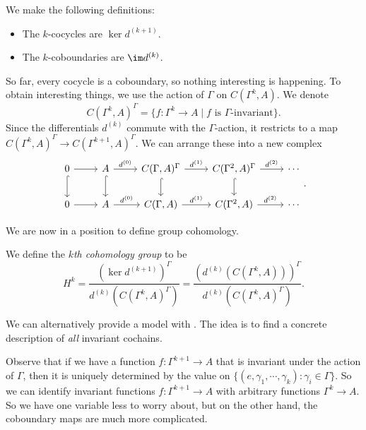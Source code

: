 \documentclass[a4paper]{article}
\begin{document}
We make the following definitions:
\begin{defi}\leavevmode
  \begin{itemize}
    \item The $k$-cocycles are $\ker d^{(k + 1)}$.
    \item The $k$-coboundaries are $\im d^{(k)}$.
  \end{itemize}
\end{defi}
So far, every cocycle is a coboundary, so nothing interesting is happening. To obtain interesting things, we use the action of $\Gamma$ on $C(\Gamma^k, A)$. We denote
\[
  C(\Gamma^k, A)^\Gamma = \{f: \Gamma^k \to A \mid f \text{ is $\Gamma$-invariant}\}.
\]
Since the differentials $d^{(k)}$ commute with the $\Gamma$-action, it restricts to a map $C(\Gamma^k, A)^\Gamma \to C(\Gamma^{k + 1}, A)^\Gamma$. We can arrange these into a new complex
\[
  \begin{tikzcd}
    0 \ar[r] \ar[d, hook] & A \ar[r, "d^{(0)}"] \ar[d, hook] & C(\Gamma, A)^\Gamma \ar[r, "d^{(1)}"] \ar[d, hook] & C(\Gamma^2, A)^\Gamma \ar[r, "d^{(2)}"]\ar[d, hook]  & \cdots\\
    0 \ar[r] & A \ar[r, "d^{(0)}"] & C(\Gamma, A) \ar[r, "d^{(1)}"] & C(\Gamma^2, A) \ar[r, "d^{(2)}"] & \cdots
  \end{tikzcd}.
\]

We are now in a position to define group cohomology.
\begin{defi}
  We define the \emph{$k$th cohomology group} to be
  \[
    H^k = \frac{(\ker d^{(k + 1)})^\Gamma}{d^{(k)} (C(\Gamma^k, A)^\Gamma)} = \frac{(d^{(k)} (C(\Gamma^k, A)))^\Gamma}{d^{(k)} (C(\Gamma^k, A)^\Gamma)}.
  \]
\end{defi}

We can alternatively provide a model with . The idea is to find a concrete description of \emph{all} invariant cochains.

Observe that if we have a function $f: \Gamma^{k + 1} \to A$ that is invariant under the action of $\Gamma$, then it is uniquely determined by the value on $\{(e, \gamma_1, \cdots, \gamma_k): \gamma_i \in \Gamma\}$. So we can identify invariant functions $f: \Gamma^{k + 1} \to A$ with arbitrary functions $\Gamma^k \to A$. So we have one variable less to worry about, but on the other hand, the coboundary maps are much more complicated.
\end{document}
